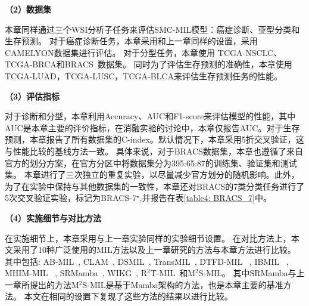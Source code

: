 \textbf{（2）数据集}

本章同样通过三个WSI分析子任务来评估SMC-MIL模型：癌症诊断、亚型分类和生存预测。
对于癌症诊断任务，本章采用和上一章同样的设置，采用CAMELYON数据集进行评估。
对于分型任务，本章使用 TCGA-NSCLC、TCGA-BRCA和BRACS~\cite{brancati2022bracs}数据集。
同时为了评估生存预测的准确性，本章使用 TCGA-LUAD，TCGA-LUSC，TCGA-BLCA来评估生存预测任务的性能。

\textbf{（3）评估指标}

对于诊断和分型，本章利用Accuracy、AUC和F1-score来评估模型的性能，其中AUC是本章主要的评价指标，在消融实验的讨论中，本章仅报告AUC。对于生存预测，本章报告了所有数据集的C-index。默认情况下，本章采用5折交叉验证，这与性能比较的基线方法一致。
具体来说，对于BRACS数据集，本章也遵循了来自官方的划分方案，在官方分区中将数据集分为395:65:87的训练集、验证集和测试集。
本章进行了三次独立的重复实验，以尽量减少官方划分的随机影响。此外，为了在实验中保持与其他数据集的一致性，本章还对BRACS的7类分类任务进行了5次交叉验证实验，标记为BRACS-7$^\star$,并报告在表\ref{table4: BRACS_7}中。



\textbf{（4）实施细节与对比方法}

在实施细节上，本章采用与上一章实验同样的实验细节设置。
在对比方法上，本文采用了10种广泛使用的MIL方法以及上一章研究的方法与本章方法进行比较。
其中包括: AB-MIL~\cite{ilse2018attention},  CLAM~\cite{lu2021data}, 
DSMIL~\cite{li2021dual}, TransMIL~\cite{shao2021transmil}, DTFD-MIL ~\cite{zhang2022dtfd},
IBMIL ~\cite{lin2023interventional}, MHIM-MIL ~\cite{tang2023multiple},
SRMamba~\cite{yang2024mambamil}, WIKG~\cite{li2024dynamic},
R$^2$T-MIL~\cite{tang2024feature}和M$^2$S-MIL。
其中SRMamba与上一章所提出的方法M$^2$S-MIL是基于Mamba架构的方法，也是本章主要的基准方法。
本文在相同的设置下复现了这些方法的结果以进行比较。
